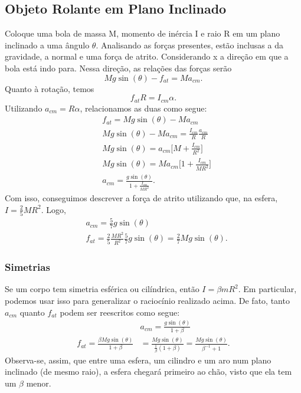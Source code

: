 \documentclass{article}
\begin{document}
\subsection{Objeto Rolante em Plano Inclinado}
  Coloque uma bola de massa M, momento de inércia I e raio R em um plano inclinado a uma ângulo \(\theta \).
Analisando as forças presentes, estão inclusas a da gravidade, a normal e uma força de atrito. Considerando x a direção em que a bola
está indo para. Nessa direção, as relações das forças serão 
  \[
    Mg\sin{(\theta )} - f_{at} = Ma_{cm}.
  \]
  Quanto à rotação, temos 
    \[
      f_{at}R = I_{cm}\alpha.
    \]
  Utilizando \(a_{cm} = R\alpha \), relacionamos as duas como segue:
 \begin{align*}
   &f_{at} = Mg\sin{(\theta )} - Ma_{cm}\\
   &Mg\sin{(\theta )} - Ma_{cm} = \frac{I_{cm}}{R}\frac{a_{cm}}{R}\\
   &Mg\sin{(\theta )} = a_{cm}\biggl[M + \frac{I_{cm}}{R^{2}}\biggr]\\
   &Mg\sin{(\theta )} = Ma_{cm}\biggl[1 + \frac{I_{cm}}{MR^{2}}\biggr]\\
   &a_{cm} = \frac{g\sin{(\theta )}}{1 + \frac{I_{cm}}{MR^{2}}}.
 \end{align*}
  Com isso, conseguimos descrever a força de atrito utilizando que, na esfera, \(I = \frac{2}{5}MR^{2}\). Logo, 
 \begin{align*}
   &a_{cm} = \frac{5}{7}g\sin{(\theta )}\\
   &f_{at} = \frac{2}{5}\frac{MR^{2}}{R^{2}}\frac{5}{7}g\sin{(\theta )} = \frac{2}{7}Mg\sin{(\theta )}.
 \end{align*}
\subsubsection{Simetrias}
  Se um corpo tem simetria esférica ou cilíndrica, então \(I = \beta mR^{2}\). Em particular, podemos usar isso para
generalizar o raciocínio realizado acima. De fato, tanto \(a_{cm}\) quanto \(f_{at}\) podem ser reescritos como segue:
\begin{align*}
  &a_{cm} = \frac{g\sin{(\theta )}}{1+\beta }\\
  f_{at} = \frac{\beta Mg\sin{(\theta )}}{1+\beta }& = \frac{Mg\sin{(\theta )}}{\frac{1}{\beta }(1+\beta )} = \frac{Mg\sin{(\theta )}}{\beta^{-1}+1}.
\end{align*}
  Observa-se, assim, que entre uma esfera, um cilindro e um aro num plano inclinado (de mesmo raio), a esfera chegará primeiro ao chão,
visto que ela tem um \(\beta \) menor.
  
\end{document}
